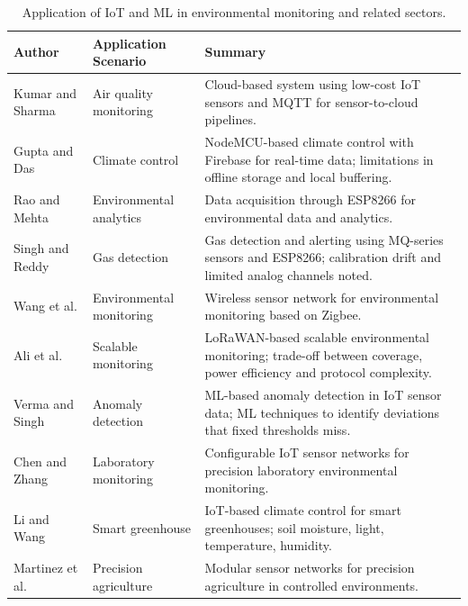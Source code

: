 \documentclass[journal,onecolumn]{IEEEtran}
\begin{document}
\begin{table}[!t]
\centering
\caption{Application of IoT and ML in environmental monitoring and related sectors.}
\label{tab:applications}
\begin{tabular}{|p{}|p{}|p{}|}
\hline
\textbf{Author} & \textbf{Application Scenario} & \textbf{Summary} \\
\hline
Kumar and Sharma \cite{sensorcloud2019} & Air quality monitoring & Cloud-based system using low-cost IoT sensors and MQTT for sensor-to-cloud pipelines. \\
\hline
Gupta and Das \cite{iotclimate2021} & Climate control & NodeMCU-based climate control with Firebase for real-time data; limitations in offline storage and local buffering. \\
\hline
Rao and Mehta \cite{esp8266data2022} & Environmental analytics & Data acquisition through ESP8266 for environmental data and analytics. \\
\hline
Singh and Reddy \cite{iotgas2023} & Gas detection & Gas detection and alerting using MQ-series sensors and ESP8266; calibration drift and limited analog channels noted. \\
\hline
Wang et al. \cite{zigbeewsn2018} & Environmental monitoring & Wireless sensor network for environmental monitoring based on Zigbee. \\
\hline
Ali et al. \cite{lorawan2020} & Scalable monitoring & LoRaWAN-based scalable environmental monitoring; trade-off between coverage, power efficiency and protocol complexity. \\
\hline
Verma and Singh \cite{mlanomaly2022} & Anomaly detection & ML-based anomaly detection in IoT sensor data; ML techniques to identify deviations that fixed thresholds miss. \\
\hline
Chen and Zhang \cite{labmonitoring2020} & Laboratory monitoring & Configurable IoT sensor networks for precision laboratory environmental monitoring. \\
\hline
Li and Wang \cite{greenhouseiot2019} & Smart greenhouse & IoT-based climate control for smart greenhouses; soil moisture, light, temperature, humidity. \\
\hline
Martinez et al. \cite{smartgreenhouse2021} & Precision agriculture & Modular sensor networks for precision agriculture in controlled environments. \\
\hline
\end{tabular}
\end{table}
\end{document}
